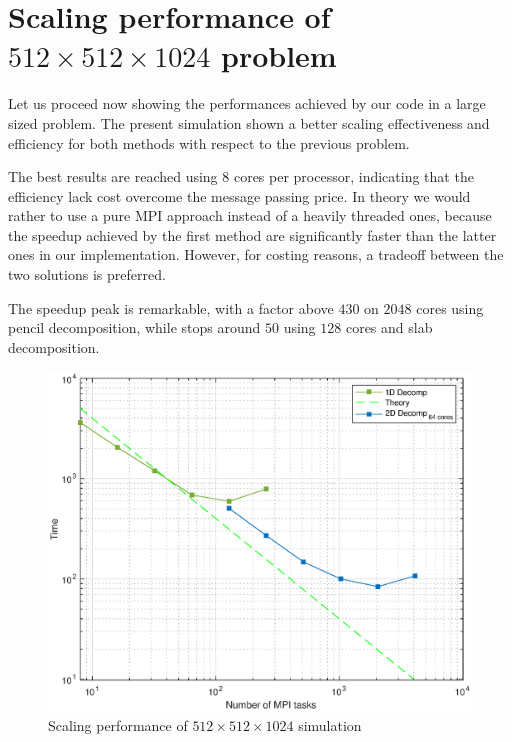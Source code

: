 \section{Scaling performance of $512\times 512\times 1024$ problem}
Let us proceed now showing the performances achieved by our code in a large sized problem.
The present simulation shown a better scaling effectiveness and efficiency for both methods with respect to the previous problem. 
\par
The best results are reached using 8 cores per processor, indicating that the efficiency lack cost overcome the message passing price.
In theory we would rather to use a pure MPI approach instead of a heavily threaded ones, because the speedup achieved by the first method are significantly faster than the latter ones in our implementation. However, for costing reasons, a tradeoff between the two solutions is preferred. \\
\par
The speedup peak is remarkable, with a factor above $430$ on $2048$ cores using pencil decomposition, while stops around $50$ using $128$ cores and slab decomposition. \\
\par

\begin{figure}
\begin{center}
\includegraphics[scale=0.55]{grafici/5121}
\caption{Scaling performance of $512\times 512\times 1024$ simulation}
\label{5121}
\end{center}
\end{figure}


